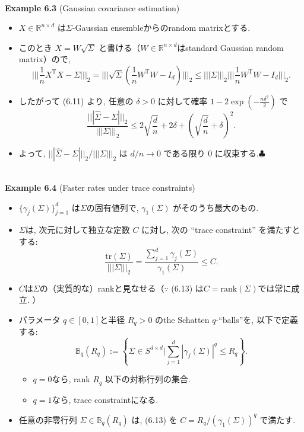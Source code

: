 \documentclass[unicode,aspectratio=169,11pt]{beamer}
\def\endexample{\hfill $\clubsuit$}
\newcommand{\bb}{\mathbb}
\newcommand{\tr}{\mathrm{T}}
\newcommand{\trace}{\mathrm{tr}}
\begin{document}
\begin{frame}{}{}
　\\
{\bf Example 6.3} (Gaussian covariance estimation)
\begin{itemize}
  \item $X \in \bb{R}^{n \times d}$ は$\Sigma$-Gaussian ensembleからのrandom matrixとする.
  \item このとき $X = W \sqrt{\Sigma}$ と書ける（$W \in \bb{R}^{n\times d}$はstandard Gaussian random matrix）ので,
          \[
              \Bigg|\Bigg|\Bigg| \frac{1}{n} X^\tr X - \Sigma \Bigg|\Bigg|\Bigg|_2
              = \Bigg|\Bigg|\Bigg|\sqrt{\Sigma}\left(\frac{1}{n}W^\tr W - I_d\right) \Bigg|\Bigg|\Bigg|_2
              \le |||\Sigma|||_2 \Bigg|\Bigg|\Bigg| \frac{1}{n} W^\tr W - I_d \Bigg|\Bigg|\Bigg|_2.
          \]
  \item したがって (6.11) より, 任意の $\delta > 0$ に対して確率 $1 - 2\exp\left(-\frac{n \delta^2}{2}\right)$ で
          \[
            \frac{||| \widehat{\Sigma} - \Sigma |||_2}{|||\Sigma|||_2}
            \le 2 \sqrt{\frac{d}{n}} + 2\delta + \left(\sqrt{\frac{d}{n}} + \delta\right)^2.
            \tag{6.12} 
          \]
  \item よって, $||| \widehat{\Sigma} - \Sigma |||_2 / |||\Sigma|||_2$ は $d/n \to 0$ である限り $0$ に収束する.\endexample
\end{itemize}
\end{frame}

\begin{frame}{}{}
　\\
{\bf Example 6.4} (Faster rates under trace constraints)
\begin{itemize}
  \item $\{ \gamma_j(\Sigma)\}_{j = 1}^d$ は$\Sigma$の固有値列で, $\gamma_1(\Sigma)$ がそのうち最大のもの.
  \item $\Sigma$は, 次元に対して独立な定数 $C$ に対し, 次の ``trace constraint'' を満たすとする:
        \[
            \frac{\trace(\Sigma)}{|||\Sigma|||_2}
            = \frac{\sum_{j=1}^d \gamma_j(\Sigma)}{\gamma_1(\Sigma)}
            \le C.
            \tag{6.13}
        \]
  \item $C$は$\Sigma$の（実質的な）rankと見なせる（$\because$ (6.13) は$C = \mathrm{rank}(\Sigma)$では常に成立. ）
  \item パラメータ $q \in [0,1]$と半径 $R_q >0$ のthe Schatten $q$-``balls''を, 以下で定義する:
        \[
          \bb{B}_q(R_q)
          := \left\{ \Sigma\in S^{d \times d} \Bigg| \sum_{j=1}^d|\gamma_j(\Sigma)|^q \le R_q \right\}.
          \tag{6.14}
        \]
        \begin{itemize}
          \item $q = 0$なら, rank $R_q$ 以下の対称行列の集合.
          \item $q = 1$なら, trace constraintになる.
        \end{itemize}
  \item 任意の非零行列 $\Sigma \in \bb{B}_q(R_q)$ は, (6.13) を $C = R_q / (\gamma_1(\Sigma))^q$ で満たす.
\end{itemize}
\end{frame}
\end{document}
